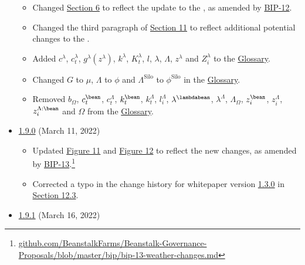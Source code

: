 \documentclass[class=article, crop=false]{standalone}
\begin{document}
\begin{itemize}[topsep=0pt, itemsep=3pt,leftmargin=16pt]
\begin{itemize}
        \item Changed \hyperlink{section.6}{Section 6} to reflect the update to the , as amended by \href{https://github.com/BeanstalkFarms/Beanstalk-Governance-Proposals/blob/master/bip/bip-12-silo-generalization.md}{BIP-12}. 
        \item Changed the third paragraph of \hyperlink{section.11}{Section 11} to reflect additional potential changes to the . 
        \item Added  $c^{\lambda}$, $c_{t}^{\lambda}$, $g^{\lambda}(z^{\lambda})$, $k^{\lambda}$, $K_{t}^{\lambda}$, $l$, $\lambda$, $\Lambda$, $z^{\lambda}$ and $Z_i^{\lambda}$ to the \hyperlink{subsection.14.11}{Glossary}. 
        \item Changed $G$ to $\mu$, $\Lambda$ to $\phi$ and $\Lambda^{\text{Silo}}$ to $\phi^{\text{Silo}}$ in the \hyperlink{subsection.14.11}{Glossary}. 
        \item Removed $b_{\Omega}$, $c_{t}^{\bean}$, $c_{t}^{\Lambda}$, $k_{t}^{\bean}$, $k_{t}^{\Lambda}$, $l_{i}^{\Lambda}$, $\lambda^{\lambdabean}$, $\lambda^{\Lambda}$, ${\Lambda}_{\Omega}$, $z_{i}^{\bean}$, $z_{i}^{\Lambda}$, $z_{i}^{\Lambda:\bean}$ and $\Omega$ from the \hyperlink{subsection.14.11}{Glossary}.
    \end{itemize}
        \item \href{https://github.com/BeanstalkFarms/Beanstalk/blob/master/version-history/beanstalk1_9_0.pdf}{1.9.0} (March 11, 2022)
    \begin{itemize}
        \item Updated \hyperref[fig 11]{Figure 11} and \hyperref[fig 12]{Figure 12} to reflect the new  changes, as amended by \href{https://github.com/BeanstalkFarms/Beanstalk-Governance-Proposals/blob/master/bip/bip-13-weather-changes.md}{BIP-13}.\footnote{\href{https://github.com/BeanstalkFarms/Beanstalk-Governance-Proposals/blob/master/bip/bip-13-weather-changes.md}{github.com/BeanstalkFarms/Beanstalk-Governance-Proposals/blob/master/bip/bip-13-weather-changes.md}}
        \item Corrected a typo in the change history for whitepaper version \href{https://github.com/BeanstalkFarms/Beanstalk/blob/master/version-history/beanstalk1_3_0.pdf}{1.3.0} in \hyperlink{subsection.12.3}{Section 12.3}.
    \end{itemize}
        \item \href{https://github.com/BeanstalkFarms/Beanstalk/blob/master/version-history/beanstalk1_9_1.pdf}{1.9.1} (March 16, 2022)

\end{itemize}
\end{document}
